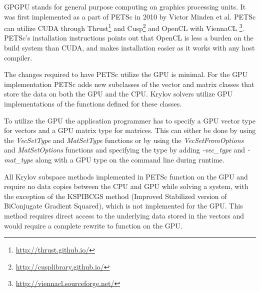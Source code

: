 GPGPU stands for general purpose computing on graphics processing units. It was 
first implemented as a part of PETSc in 2010\cite{minden2010preliminary} by Victor 
Minden et al. PETSc can utilize CUDA through Thrust\footnote{\url{http://thrust.github.io/}} 
and Cusp\footnote{\url{http://cusplibrary.github.io/}} and OpenCL with ViennaCL
\footnote{\url{http://viennacl.sourceforge.net/}}. PETSc's installation instructions 
points out that OpenCL is less a burden on the build system than CUDA, and makes 
installation easier as it works with any host compiler. 

The changes required to have PETSc utilize the GPU is minimal. For the GPU 
implementation PETSc adds new subclasses of the vector and matrix classes that 
store the data on both the GPU and the CPU. Krylov solvers utilize GPU implementations 
of the functions defined for these classes.

To utilize the GPU the application programmer has to specify a GPU vector type 
for vectors and a GPU matrix type for matrices. This can either be done by using 
the \emph{VecSetType} and \emph{MatSetType} functions or by using the \emph{VecSetFromOptions}
and \emph{MatSetOptions} functions and specifying the type by adding \emph{-vec\_type} and 
\emph{-mat\_type} along with a GPU type on the command line during runtime. 

All Krylov subspace methods implemented in PETSc function on the GPU and require 
no data copies between the CPU and GPU while solving a system, with the exception
of the KSPIBCGS method (Improved Stabilized version of BiConjugate Gradient Squared),
which is not implemented for the GPU. This method requires direct access to the 
underlying data stored in the vectors and would require a complete rewrite to 
function on the GPU.
